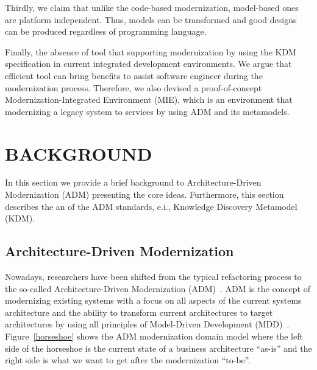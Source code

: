 \documentclass[a4paper,twoside]{article}
\begin{document}


Thirdly, we claim that unlike the code-based modernization, model-based ones are platform independent. Thus, models can be transformed and good designs can be produced regardless of programming language. 

Finally, the absence of tool that supporting modernization by using the KDM specification in current integrated development environments. We argue that efficient tool can bring benefits to assist software engineer during the modernization process. Therefore, we also devised a proof-of-concept Modernization-Integrated Environment (MIE), which is an environment that modernizing a legacy system to services by using ADM and its metamodels.

\section{\uppercase{Background}}

\noindent In this section we provide a brief background to Architecture-Driven Modernization (ADM) presenting the core ideas. Furthermore, this section describes the an of the ADM standards, e.i., Knowledge Discovery Metamodel (KDM).
 

\subsection{Architecture-Driven Modernization}

Nowadays, researchers have been shifted from the typical refactoring process to the so-called Architecture-Driven Modernization (ADM)~\cite{SMR:SMR582,5773392,Guzman:2007:AAR:1339262.1339532,Bruneliere:2010:MGE:1858996.1859032,delCastillo:2009:PRP:1529282.1529753}. ADM is the concept of modernizing existing systems with a focus on all aspects of the current systems architecture and the ability to transform current architectures to target architectures by using all principles of Model-Driven Development (MDD)~\cite{Guzman:2007:AAR:1339262.1339532}. Figure~\ref{horseshoe} shows the ADM modernization domain model where the left side of the horseshoe is the current state of a business architecture ``as-is'' and the right side is what we want to get after the modernization ``to-be''.
\end{document}
